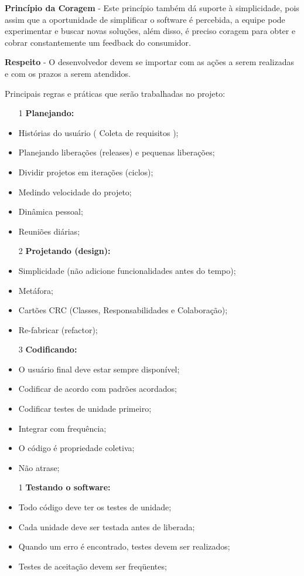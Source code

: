 \documentclass{automatextcc}
\begin{document}
\textbf{Princípio da Coragem} - Este princípio também dá suporte à simplicidade, pois assim que a oportunidade de simplificar o software é percebida, a equipe pode experimentar e buscar novas soluções, além disso, é preciso coragem para obter e cobrar constantemente um feedback do consumidor.


\textbf{Respeito} - O desenvolvedor devem se importar com as ações a serem realizadas e com os prazos a serem atendidos.

Principais regras e práticas que serão trabalhadas no projeto:

\begin{itemize}
    
\item[1] \textbf{Planejando:}
\item Histórias do usuário ( Coleta de requisitos );
\item Planejando liberações (releases) e pequenas liberações;
\item Dividir projetos em iterações (ciclos);
\item Medindo velocidade do projeto;
\item Dinâmica pessoal;
\item Reuniões diárias;

\item[2] \textbf{Projetando (design):}
\item Simplicidade (não adicione funcionalidades antes do tempo);
\item Metáfora;
\item Cartões CRC (Classes, Responsabilidades e Colaboração);
\item Re-fabricar (refactor);

\item[3] \textbf{Codificando:}
\item O usuário final deve estar sempre disponível;
\item Codificar de acordo com padrões acordados;
\item Codificar testes de unidade primeiro;
\item Integrar com frequência;
\item O código é propriedade coletiva;
\item Não atrase;

\item[1] \textbf{Testando o software:}

\item Todo código deve ter os testes de unidade;
\item Cada unidade deve ser testada antes de liberada;
\item Quando um erro é encontrado, testes devem ser realizados;
\item Testes de aceitação devem ser freqüentes;
\end{itemize}
\end{document}
